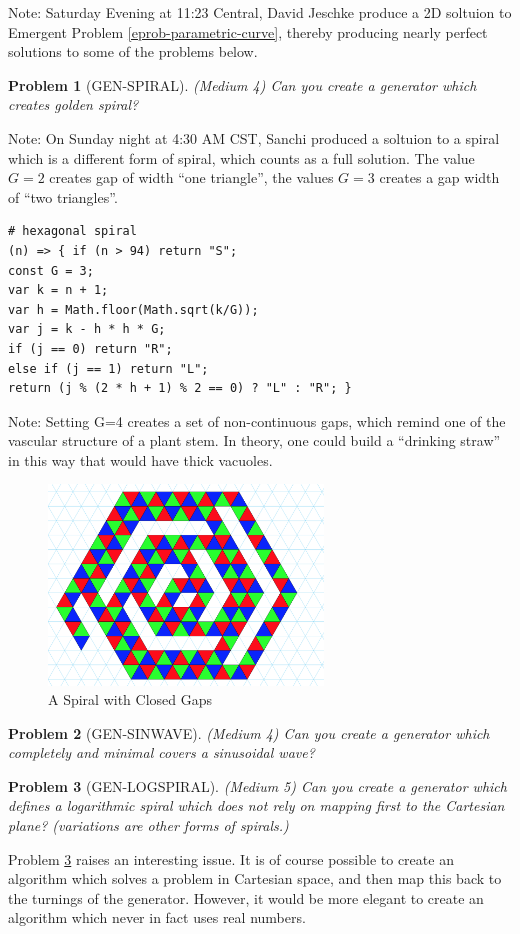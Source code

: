 \documentclass[11pt]{article}
\newtheorem{problem}{Problem}
\begin{document}
Note: Saturday Evening at 11:23 Central, David Jeschke produce a 2D soltuion to Emergent Problem \ref{eprob-parametric-curve}, thereby producing nearly
perfect solutions to some of the problems below.




\begin{problem}[GEN-SPIRAL]
  (Medium 4) Can you create a generator which creates golden spiral?
\end{problem}

Note: On Sunday night at 4:30 AM CST, Sanchi produced a soltuion to a spiral which is a different form of spiral,
which counts as a full solution. The value $G=2$ creates gap of width ``one triangle'', the values $G=3$ creates a gap width of ``two triangles''.


\begin{verbatim}
# hexagonal spiral 
(n) => { if (n > 94) return "S"; 
const G = 3;
var k = n + 1; 
var h = Math.floor(Math.sqrt(k/G)); 
var j = k - h * h * G; 
if (j == 0) return "R"; 
else if (j == 1) return "L"; 
return (j % (2 * h + 1) % 2 == 0) ? "L" : "R"; }
\end{verbatim}

Note: Setting G=4 creates a set of non-continuous gaps, which remind one of the vascular structure of a plant stem. In theory,
one could build a ``drinking straw'' in this way that would have thick vacuoles.

\begin{figure}
     \centering
     \includegraphics[width=0.65\textwidth]{figures/SpiralWithClosedGaps.png}
     \caption{A Spiral with Closed Gaps}
  \label{fig:equitetrabeam}
\end{figure}

\begin{problem}[GEN-SINWAVE]
  (Medium 4) Can you create a generator which completely and minimal covers a sinusoidal wave?
\end{problem}
\begin{problem}[GEN-LOGSPIRAL]
  \label{probgenlogspiral}
  (Medium 5) Can you create a generator which defines a logarithmic spiral which does not rely on mapping first to the Cartesian plane?
  (variations are other forms of spirals.)
\end{problem}
Problem \ref{probgenlogspiral} raises an interesting issue. It is of course possible to create an algorithm which solves a problem in Cartesian space, and then
map this back to the turnings of the generator. However, it would be more elegant to create an algorithm which never in fact uses real numbers.
\end{document}
